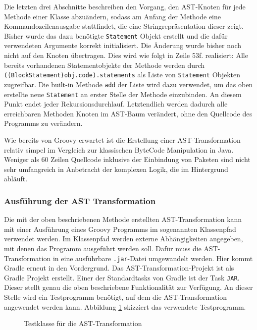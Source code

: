 Die letzten drei Abschnitte beschreiben den Vorgang, den AST-Knoten für jede Methode einer Klasse abzuändern, sodass am Anfang der Methode eine Kommandozeilenausgabe stattfindet, die eine Stringrepräsentation dieser zeigt. 
Bisher wurde das dazu benötigte \texttt{Statement} Objekt erstellt und die dafür verwendeten Argumente korrekt initialisiert. 
Die Änderung wurde bisher noch nicht auf den Knoten übertragen. 
Dies wird wie folgt in Zeile 53f. realisiert:
Alle bereits vorhandenen Statementobjekte der Methode werden durch \texttt{((BlockStatement)obj.code).statements} als Liste von \texttt{Statement} Objekten zugreifbar. Die built-in Methode \texttt{add} der Liste wird dazu verwendet, um das oben erstellte neue \texttt{Statement} an erster Stelle der Methode einzubinden. 
An diesem Punkt endet jeder Rekursionsdurchlauf. 
Letztendlich werden dadurch alle erreichbaren Methoden Knoten im AST-Baum verändert, ohne den Quellcode des Programms zu verändern. 

Wie bereits von Groovy erwartet ist die Erstellung einer AST-Transformation relativ simpel im Vergleich zur klassischen ByteCode Manipulation in Java.
Weniger als 60 Zeilen Quellcode inklusive der Einbindung von Paketen sind nicht sehr umfangreich in Anbetracht der komplexen Logik, die im Hintergrund abläuft.


\subsubsection{Ausführung der AST Transformation}
Die mit der oben beschriebenen Methode erstellten AST-Transformation kann mit einer Ausführung eines Groovy Programms im sogenannten Klassenpfad verwendet werden. 
Im Klassenpfad werden externe Abhängigkeiten angegeben, mit denen das Programm ausgeführt werden soll. 
Dafür muss die AST-Transformation in eine ausführbare \texttt{.jar}-Datei umgewandelt werden. 
Hier kommt Gradle erneut in den Vordergrund. 
Das AST-Transformation-Projekt ist als Gradle Projekt erstellt. 
Einer der Standardtasks von Gradle ist der Task \texttt{JAR}. 
Dieser stellt genau die oben beschriebene Funktionalität zur Verfügung. 
An dieser Stelle wird ein Testprogramm benötigt, auf dem die AST-Transformation angewendet werden kann. 
Abbildung \ref{fig:Greeter} skizziert das verwendete Testprogramm.

\begin{figure}[hbt!]
	
	\caption{Testklasse für die AST-Transformation}
	\label{fig:Greeter}
\end{figure}

